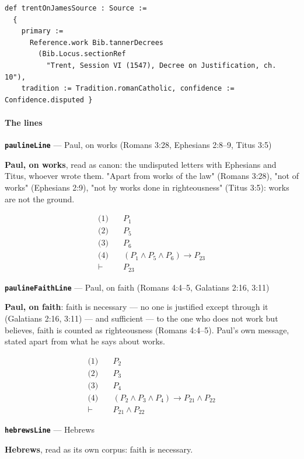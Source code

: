 \documentclass[11pt]{article}
\begin{document}
{\small\begin{verbatim}
def trentOnJamesSource : Source :=
  {
    primary :=
      Reference.work Bib.tannerDecrees
        (Bib.Locus.sectionRef
          "Trent, Session VI (1547), Decree on Justification, ch. 10"),
    tradition := Tradition.romanCatholic, confidence := Confidence.disputed }
\end{verbatim}}
\paragraph*{The lines}
\leavevmode\par
\par\medskip\noindent\textbf{\texttt{pauline\allowbreak{}Line}} --- Paul, on works (Romans 3:28, Ephesians 2:8–9, Titus 3:5)\par\nobreak\noindent
\textbf{Paul, on works}, read as canon: the undisputed letters with Ephesians and Titus, whoever wrote them. "Apart from works of the law" (Romans 3:28), "not of works" (Ephesians 2:9), "not by works done in righteousness" (Titus 3:5): works are not the ground.

\begin{align*}
  \text{(1)} \quad & P_{1} \\
  \text{(2)} \quad & P_{5} \\
  \text{(3)} \quad & P_{6} \\
  \text{(4)} \quad & (P_{1} \land P_{5} \land P_{6}) \rightarrow P_{23} \\
  \vdash \quad & P_{23}
\end{align*}
\par\medskip\noindent\textbf{\texttt{pauline\allowbreak{}Faith\allowbreak{}Line}} --- Paul, on faith (Romans 4:4–5, Galatians 2:16, 3:11)\par\nobreak\noindent
\textbf{Paul, on faith}: faith is necessary — no one is justified except through it (Galatians 2:16, 3:11) — and sufficient — to the one who does not work but believes, faith is counted as righteousness (Romans 4:4–5). Paul's own message, stated apart from what he says about works.

\begin{align*}
  \text{(1)} \quad & P_{2} \\
  \text{(2)} \quad & P_{3} \\
  \text{(3)} \quad & P_{4} \\
  \text{(4)} \quad & (P_{2} \land P_{3} \land P_{4}) \rightarrow P_{21} \land P_{22} \\
  \vdash \quad & P_{21} \land P_{22}
\end{align*}
\par\medskip\noindent\textbf{\texttt{hebrews\allowbreak{}Line}} --- Hebrews\par\nobreak\noindent
\textbf{Hebrews}, read as its own corpus: faith is necessary.
\end{document}
